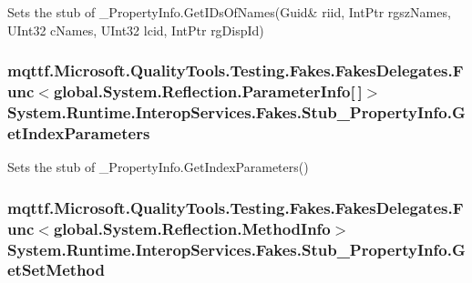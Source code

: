 Sets the stub of \-\_\-\-Property\-Info.\-Get\-I\-Ds\-Of\-Names(Guid\& riid, Int\-Ptr rgsz\-Names, U\-Int32 c\-Names, U\-Int32 lcid, Int\-Ptr rg\-Disp\-Id)

\hypertarget{class_system_1_1_runtime_1_1_interop_services_1_1_fakes_1_1_stub___property_info_a05b43c4370768a55bb72001a1c16aff8}{
\subsubsection[{Get\-Index\-Parameters}]{\setlength{\rightskip}{0pt plus 5cm}mqttf.\-Microsoft.\-Quality\-Tools.\-Testing.\-Fakes.\-Fakes\-Delegates.\-Func$<$global.\-System.\-Reflection.\-Parameter\-Info\mbox{[}$\,$\mbox{]}$>$ System.\-Runtime.\-Interop\-Services.\-Fakes.\-Stub\-\_\-\-Property\-Info.\-Get\-Index\-Parameters}}\label{class_system_1_1_runtime_1_1_interop_services_1_1_fakes_1_1_stub___property_info_a05b43c4370768a55bb72001a1c16aff8}


Sets the stub of \-\_\-\-Property\-Info.\-Get\-Index\-Parameters()

\hypertarget{class_system_1_1_runtime_1_1_interop_services_1_1_fakes_1_1_stub___property_info_ae68aa377b07e4037c676108c8f223005}{
\subsubsection[{Get\-Set\-Method}]{\setlength{\rightskip}{0pt plus 5cm}mqttf.\-Microsoft.\-Quality\-Tools.\-Testing.\-Fakes.\-Fakes\-Delegates.\-Func$<$global.\-System.\-Reflection.\-Method\-Info$>$ System.\-Runtime.\-Interop\-Services.\-Fakes.\-Stub\-\_\-\-Property\-Info.\-Get\-Set\-Method}}\label{class_system_1_1_runtime_1_1_interop_services_1_1_fakes_1_1_stub___property_info_ae68aa377b07e4037c676108c8f223005}


